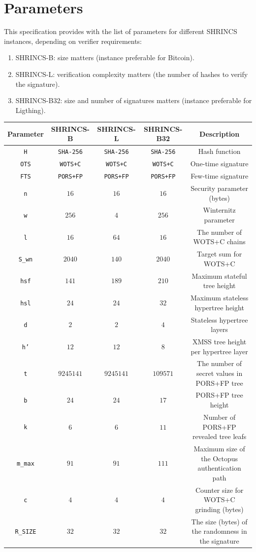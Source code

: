 \section{Parameters}
This specification provides with the list of parameters for different SHRINCS instances, depending on verifier requirements:
\begin{enumerate}
    \item SHRINCS-B: size matters (instance preferable for Bitcoin).
    \item SHRINCS-L: verification complexity matters (the number of hashes to verify the signature).
    \item SHRINCS-B32: size and number of signatures matters (instance preferable for Ligthing). 
\end{enumerate}

\begin{center}
\begin{tabular}{ c c c c c}
 Parameter & SHRINCS-B & SHRINCS-L & SHRINCS-B32 & Description \\ 
 \hline
 \texttt{H} & \texttt{SHA-256} & \texttt{SHA-256} & \texttt{SHA-256} & Hash function \\ 
 \texttt{OTS} & \texttt{WOTS+C} & \texttt{WOTS+C} & \texttt{WOTS+C} &  One-time signature \\ 
 \texttt{FTS} & \texttt{PORS+FP} & \texttt{PORS+FP} & \texttt{PORS+FP} & Few-time signature \\ 
 \texttt{n} & $16$ & $16$ & $16$ & Security parameter (bytes) \\  
 \texttt{w} & $256$ & $4$ & $256$ & Winternitz parameter \\
 \texttt{l}  & $16$ & $64$ & $16$ & The number of WOTS+C chains \\
 \texttt{S\_wn} & $2040$ & $140$ & $2040$ & Target sum for WOTS+C \\
 \texttt{hsf} & $141$ & $189$ & $210$ & Maximum stateful tree height \\
 \texttt{hsl} & $24$ & $24$ & $32$ & Maximum stateless hypertree height \\
 \texttt{d} & $2$ & $2$ & $4$ & Stateless hypertree layers \\
 \texttt{h'} & $12$ & $12$ & $8$ & XMSS tree height per hypertree layer \\
 \texttt{t} & $9245141$ & $9245141$ & $109571$ & The number of secret values in PORS+FP tree \\ 
 \texttt{b} & $24$ & $24$ & $17$ & PORS+FP tree height \\ 
 \texttt{k} & $6$ & $6$ & $11$ & Number of PORS+FP revealed tree leafs \\ 
 \texttt{m\_max} & $91$ & $91$ & $111$ & Maximum size of the Octopus authentication path \\
 \texttt{c} & $4$ & $4$ & $4$ & Counter size for WOTS+C grinding (bytes) \\
 \texttt{R\_SIZE} & $32$ & $32$ & $32$ & The size (bytes) of the randomness in the signature \\

\end{tabular}
\end{center}


